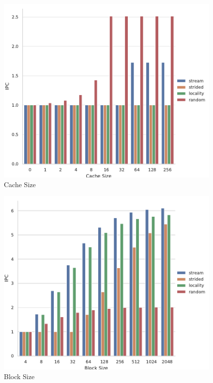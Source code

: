 \documentclass[a4paper]{article}
\begin{document}
\begin{figure}
    \centering
    \includegraphics[width=\textwidth]{cache_size}
    \caption{Cache Size}
    \label{fig:cache-size}
\end{figure}

\begin{figure}
    \centering
    \includegraphics[width=\textwidth]{block_size}
    \caption{Block Size}
    \label{fig:block-size}
\end{figure}
\end{document}
